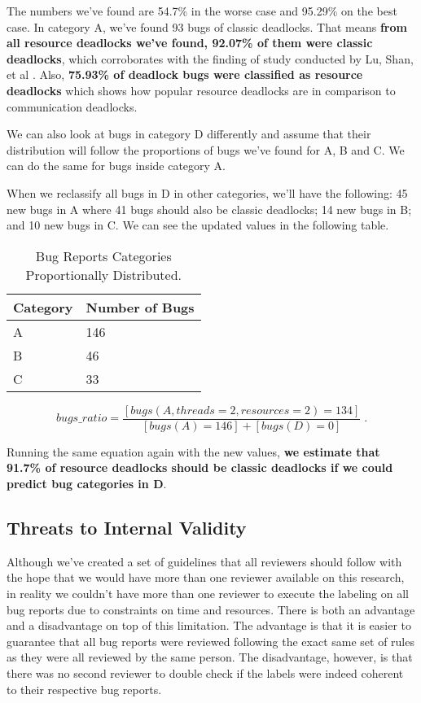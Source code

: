 The numbers we've found are 54.7\% in the worse case and 95.29\% on the best case. In category A, we've found 93 bugs of classic deadlocks. That means \textbf{from all resource deadlocks we've found, 92.07\% of them were classic deadlocks}, which corroborates with the finding of study conducted by Lu, Shan, et al \cite{lu}. Also, \textbf{75.93\% of deadlock bugs were classified as resource deadlocks} which shows how popular resource deadlocks are in comparison to communication deadlocks.

We can also look at bugs in category D differently and assume that their distribution will follow the proportions of bugs we've found for A, B and C. We can do the same for bugs inside category A.

When we reclassify all bugs in D in other categories, we'll have the following: 45 new bugs in A where 41 bugs should also be classic deadlocks; 14 new bugs in B; and 10 new bugs in C. We can see the updated values in the following table.

\begin{table}
\begin{center}
\caption{Bug Reports Categories Proportionally Distributed.}
\begin{tabular}{|l|l|}
\hline
Category & Number of Bugs \\
\hline
A & 146 \\   
B & 46 \\
C & 33 \\
\hline
\end{tabular}
\end{center}
\end{table}

\begin{equation}
bugs\_ratio = \frac{ [ bugs(A, threads=2, resources=2) = 134 ] }{ [bugs(A) = 146] + [bugs(D) = 0] } \; .
\end{equation}

Running the same equation again with the new values, \textbf{we estimate that 91.7\% of resource deadlocks should be classic deadlocks if we could predict bug categories in D}.

\subsection{Threats to Internal Validity}

Although we've created a set of guidelines that all reviewers should follow with the hope that we would have more than one reviewer available on this research,
in reality we couldn't have more than one reviewer to execute the labeling on all bug reports due to constraints on time and resources. There is both an advantage
and a disadvantage on top of this limitation. The advantage is that it is easier to guarantee that all bug reports were reviewed following the exact same set of rules
as they were all reviewed by the same person. The disadvantage, however, is that there was no second reviewer to double check if the labels
were indeed coherent to their respective bug reports.

